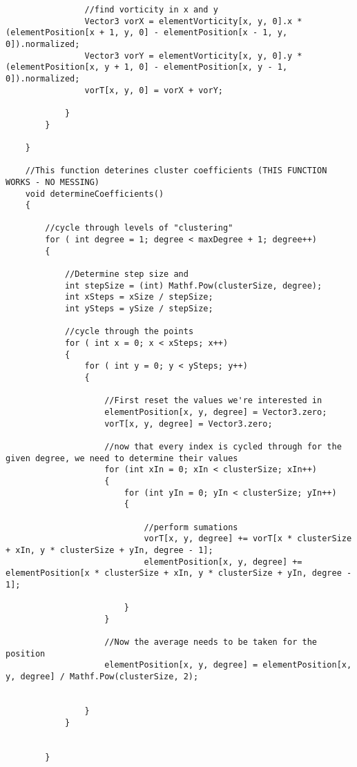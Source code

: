 \begin{mdframed}[linecolor=black, topline=true, bottomline=true,
  leftline=false, rightline=false]
\begin{verbatim}
                //find vorticity in x and y
                Vector3 vorX = elementVorticity[x, y, 0].x * (elementPosition[x + 1, y, 0] - elementPosition[x - 1, y, 0]).normalized;
                Vector3 vorY = elementVorticity[x, y, 0].y * (elementPosition[x, y + 1, 0] - elementPosition[x, y - 1, 0]).normalized;
                vorT[x, y, 0] = vorX + vorY;

            }
        }

    }

    //This function deterines cluster coefficients (THIS FUNCTION WORKS - NO MESSING)
    void determineCoefficients()
    {
        
        //cycle through levels of "clustering"
        for ( int degree = 1; degree < maxDegree + 1; degree++)
        {

            //Determine step size and 
            int stepSize = (int) Mathf.Pow(clusterSize, degree);
            int xSteps = xSize / stepSize;
            int ySteps = ySize / stepSize;

            //cycle through the points
            for ( int x = 0; x < xSteps; x++)   
            {
                for ( int y = 0; y < ySteps; y++)
                {

                    //First reset the values we're interested in
                    elementPosition[x, y, degree] = Vector3.zero;
                    vorT[x, y, degree] = Vector3.zero;

                    //now that every index is cycled through for the given degree, we need to determine their values 
                    for (int xIn = 0; xIn < clusterSize; xIn++)
                    {
                        for (int yIn = 0; yIn < clusterSize; yIn++)
                        {

                            //perform sumations
                            vorT[x, y, degree] += vorT[x * clusterSize + xIn, y * clusterSize + yIn, degree - 1];
                            elementPosition[x, y, degree] += elementPosition[x * clusterSize + xIn, y * clusterSize + yIn, degree - 1];

                        }
                    }

                    //Now the average needs to be taken for the position
                    elementPosition[x, y, degree] = elementPosition[x, y, degree] / Mathf.Pow(clusterSize, 2);


                }
            }
            

        }


\end{verbatim}
\end{mdframed}
